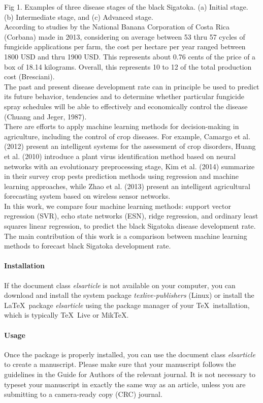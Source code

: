 \documentclass[review]{elsarticle}
\begin{document}
Fig 1. Examples of three disease stages of the black Sigatoka. (a) Initial stage. (b) Intermediate stage, and (c) Advanced stage.\\
According to studies by the National Banana Corporation of Costa Rica (Corbana) made in 2013, considering on average between 53 thru 57 cycles of fungicide applications per farm, the cost per hectare per year ranged between 1800 USD and thru 1900 USD. This represents about 0.76 cents of the price of a box of 18.14 kilograms. Overall, this represents 10 to 12 of the total production cost (Bresciani).\\
The past and present disease development rate can in principle be used to predict its future behavior, tendencies and to determine whether particular fungicide spray schedules will be able to effectively and economically control the disease (Chuang and Jeger, 1987).\\
There are efforts to apply machine learning methods for decision-making in agriculture, including the control of crop diseases. For example, Camargo et al. (2012) present an intelligent systems for the assessment of crop disorders, Huang et al. (2010) introduce a plant virus identification method based on neural networks with an evolutionary preprocessing stage, Kim et al. (2014) summarize in their survey crop pests prediction methods using regression and machine learning approaches, while Zhao et al. (2013) present an intelligent agricultural forecasting system based on wireless sensor networks.\\
In this work, we compare four machine learning methods: support vector regression (SVR), echo state networks (ESN), ridge regression, and ordinary least squares linear regression, to predict the black Sigatoka disease development rate.\\
The main contribution of this work is a comparison between machine learning methods to forecast black Sigatoka development rate.\\

\paragraph{Installation} If the document class \emph{elsarticle} is not available on your computer, you can download and install the system package \emph{texlive-publishers} (Linux) or install the \LaTeX\ package \emph{elsarticle} using the package manager of your \TeX\ installation, which is typically \TeX\ Live or Mik\TeX.

\paragraph{Usage} Once the package is properly installed, you can use the document class \emph{elsarticle} to create a manuscript. Please make sure that your manuscript follows the guidelines in the Guide for Authors of the relevant journal. It is not necessary to typeset your manuscript in exactly the same way as an article, unless you are submitting to a camera-ready copy (CRC) journal.
\end{document}
